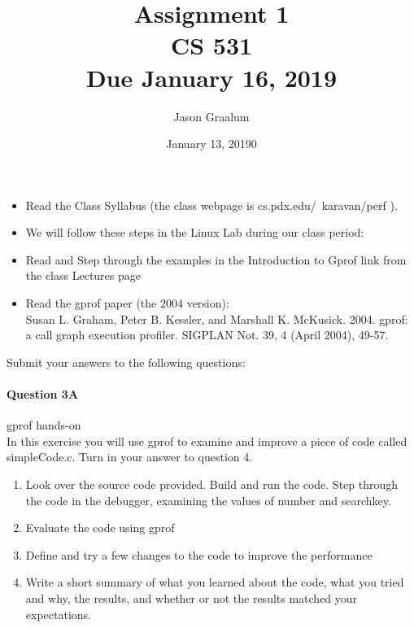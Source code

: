 \documentclass[11pt]{article}
\title{\bf Assignment 1 \\[2ex]
\rm\normalsize CS 531 \\ Due January 16, 2019}
\date{January 13, 20190}
\author{Jason Graalum}
\begin{document}
\maketitle

\begin{itemize}
\item Read the Class Syllabus (the class webpage is cs.pdx.edu/~karavan/perf ).
\item We will follow these steps in the Linux Lab during our class period:
\item Read and Step through the examples in the Introduction to Gprof link from the class Lectures page
\item Read the gprof paper (the 2004 version):\\
Susan L. Graham, Peter B. Kessler, and Marshall K. McKusick. 2004. gprof: a call graph execution profiler. SIGPLAN Not. 39, 4 (April 2004), 49-57.
\end{itemize}
Submit your answers to the following questions:\\
 
\paragraph{Question 3A} gprof hands-on\\
In this exercise you will use gprof to examine and improve a piece of code called simpleCode.c. Turn in your answer to question 4.

\begin{enumerate}
\item Look over the source code provided. Build and run the code. Step through the code in the debugger, examining the values of number and searchkey.
\item Evaluate the code using gprof
\item Define and try a few changes to the code to improve the performance
\item Write a short summary of what you learned about the code, what you tried and why, the results,
and whether or not the results matched your expectations.
\end{enumerate}
\end{document}
